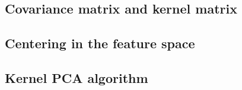 

\subsection{Covariance matrix and kernel matrix}
\label{sub:covariance-and-kernel}


\subsection{Centering in the feature space}
\label{sub:centering-in-the-feature-space}


\subsection{Kernel PCA algorithm}
\label{sub:kpca-algo}

